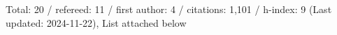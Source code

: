 Total: 20 / refereed: 11 / first author: 4 / citations: 1,101 / h-index: 9 (Last updated: 2024-11-22), List attached below